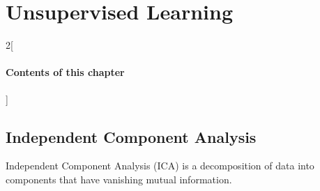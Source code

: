 \chapter{Unsupervised Learning}

\begin{multicols}{2}[\subsubsection*{Contents of this chapter}]
\end{multicols}

\section{Independent Component Analysis}
Independent Component Analysis (ICA) is a decomposition of data into components that have vanishing mutual information. 




\chapauthor{}